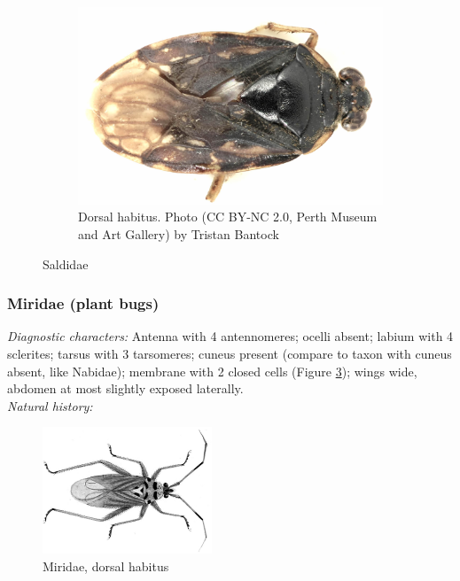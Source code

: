 \documentclass[letterpaper, 11pt]{article}
\begin{document}
\begin{figure}[ht!]
 \qquad
 \begin{subfigure}[ht!]{0.45\textwidth}
  \includegraphics[width=\textwidth]{SaldidHabitus}
  \caption{Dorsal habitus. Photo (CC BY-NC 2.0, Perth Museum and Art Gallery) by Tristan Bantock}
  \label{fig:saldid2}
 \end{subfigure}
 \caption{Saldidae}\label{fig:saldids}
\end{figure}

\subsubsection{Miridae (plant bugs)}
\noindent{}\textit{Diagnostic characters:} Antenna with 4 antennomeres; ocelli absent; labium with 4 sclerites; tarsus with 3 tarsomeres; cuneus present (compare to taxon with cuneus absent, like Nabidae); membrane with 2 closed cells (Figure \ref{fig:mirid}); wings wide, abdomen at most slightly exposed laterally.\\

\noindent{}\textit{Natural history:} \\

\begin{figure}[ht!]
 \centering
 \includegraphics[width=0.45\textwidth]{MiridHabitus}
 \caption{Miridae, dorsal habitus \citep[][Plate II, Fig. 1]{bhl132930}}
 \label{fig:mirid}
\end{figure}
\end{document}
